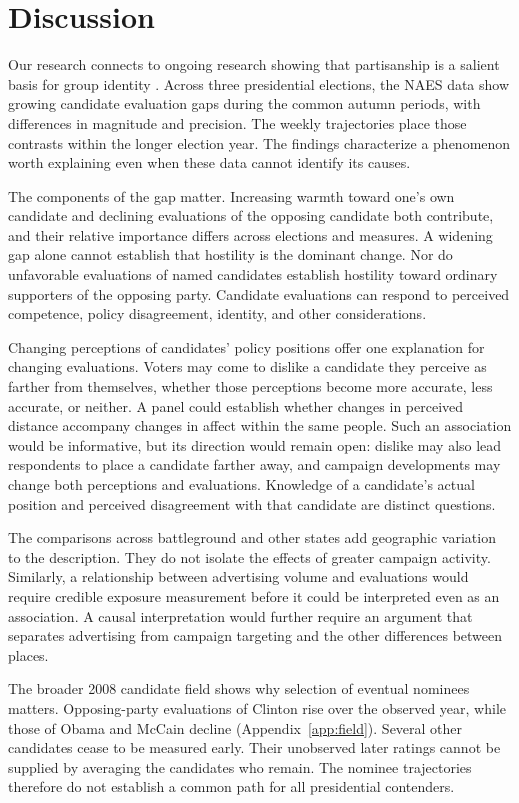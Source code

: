 \documentclass[11pt,letterpaper]{article}
\begin{document}
\section*{Discussion}
Our research connects to ongoing research showing that partisanship is a salient basis for group identity \citep{iyengar2012, freeze2012}. Across three presidential elections, the NAES data show growing candidate evaluation gaps during the common autumn periods, with differences in magnitude and precision. The weekly trajectories place those contrasts within the longer election year. The findings characterize a phenomenon worth explaining even when these data cannot identify its causes.

The components of the gap matter. Increasing warmth toward one's own candidate and declining evaluations of the opposing candidate both contribute, and their relative importance differs across elections and measures. A widening gap alone cannot establish that hostility is the dominant change. Nor do unfavorable evaluations of named candidates establish hostility toward ordinary supporters of the opposing party. Candidate evaluations can respond to perceived competence, policy disagreement, identity, and other considerations.

Changing perceptions of candidates' policy positions offer one explanation for changing evaluations. Voters may come to dislike a candidate they perceive as farther from themselves, whether those perceptions become more accurate, less accurate, or neither. A panel could establish whether changes in perceived distance accompany changes in affect within the same people. Such an association would be informative, but its direction would remain open: dislike may also lead respondents to place a candidate farther away, and campaign developments may change both perceptions and evaluations. Knowledge of a candidate's actual position and perceived disagreement with that candidate are distinct questions.

The comparisons across battleground and other states add geographic variation to the description. They do not isolate the effects of greater campaign activity. Similarly, a relationship between advertising volume and evaluations would require credible exposure measurement before it could be interpreted even as an association. A causal interpretation would further require an argument that separates advertising from campaign targeting and the other differences between places.

The broader 2008 candidate field shows why selection of eventual nominees matters. Opposing-party evaluations of Clinton rise over the observed year, while those of Obama and McCain decline (Appendix~\ref{app:field}). Several other candidates cease to be measured early. Their unobserved later ratings cannot be supplied by averaging the candidates who remain. The nominee trajectories therefore do not establish a common path for all presidential contenders.
\end{document}
